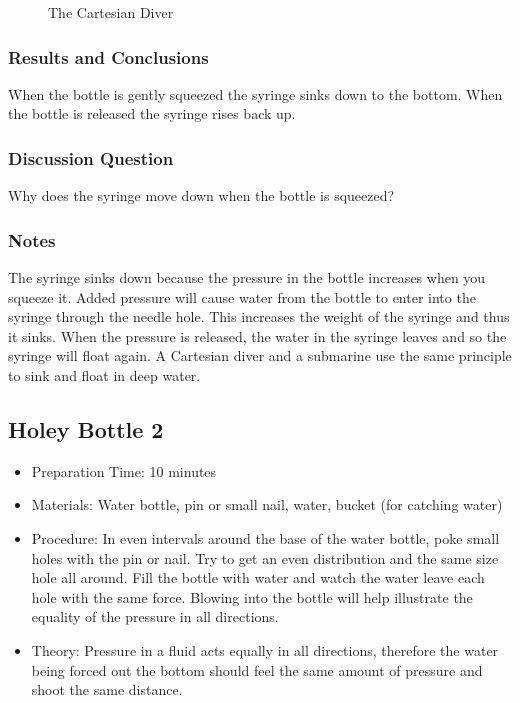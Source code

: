 \begin{figure}
\begin{center}
\def\svgwidth{100pt}

\caption{The Cartesian Diver}
\label{fig:cartesian-diver}
\end{center}
\end{figure}

\subsubsection*{Results and Conclusions}
When the bottle is gently squeezed the syringe sinks down to the bottom. When the bottle is released the syringe rises back up. 

\subsubsection*{Discussion Question}
Why does the syringe move down when the bottle is squeezed?

\subsubsection*{Notes}
The syringe sinks down because the pressure in the bottle increases when you squeeze it. Added pressure will cause water from the bottle to enter into the syringe through the needle hole. This increases the weight of the syringe and thus it sinks. When the pressure is released, the water in the syringe leaves and so the syringe will float again. A Cartesian diver and a submarine use the same principle to sink and float in deep water.

	
\subsection{Holey Bottle 2}
\begin{itemize}
\item{Preparation Time: 10 minutes}
\item{Materials: Water bottle, pin or small nail, water, bucket (for catching water)}
\item{Procedure: In even intervals around the base of the water bottle, poke small holes with the pin or nail. Try to get an even distribution and the same size hole all around. Fill the bottle with water and watch the water leave each hole with the same force. Blowing into the bottle will help illustrate the equality of the pressure in all directions.}
\item{Theory: Pressure in a fluid acts equally in all directions, therefore the water being forced out the bottom should feel the same amount of pressure and shoot the same distance.}
\end{itemize}


